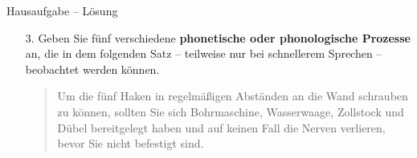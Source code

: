 \begin{frame}{Hausaufgabe -- Lösung}

\begin{itemize}
\item[3.]{Geben Sie fünf verschiedene \textbf{phonetische oder phonologische Prozesse} an, die in dem folgenden Satz -- teilweise nur bei schnellerem Sprechen -- beobachtet werden können.} 

\begin{exe}
	\begin{quote}
	Um die fünf Haken in regelmäßigen Abständen an die Wand schrauben zu können, sollten Sie sich Bohrmaschine, Wasserwaage, Zollstock und Dübel bereitgelegt haben und auf keinen Fall die Nerven verlieren, bevor Sie nicht befestigt sind.
	\end{quote}
\end{exe}


	\begin{description}
		\item[] ~
	
		\end{description}

\end{itemize}

\end{frame}



